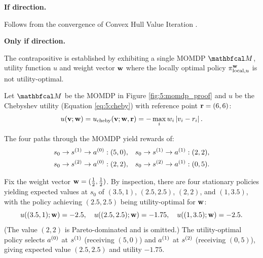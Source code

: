     \begin{proofoutline}
        \textbf{If direction.}

        Follows from the convergence of Convex Hull Value Iteration \cite{chvi}.

        \textbf{Only if direction.}

        The contrapositive is established by exhibiting a single MOMDP $\bfcl{M}$, utility function $u$ and weight vector $\mathbf{w}$ where the locally optimal policy $\pi^{\mathbf{w}}_{\text{local},u}$ is not utility-optimal. 
        
        Let $\bfcl{M}$ be the MOMDP in Figure \ref{fig:5:momdp_proof} and $u$ be the Chebyshev utility (Equation \eqref{eq:5:cheby}) with reference point $\mathbf{r} = (6, 6)$:
        \begin{align}
            u(\mathbf{v}; \mathbf{w}) = {u_{\textnormal{cheby}}}(\mathbf{v}; \mathbf{w}, \mathbf{r}) = -\max_i w_i \left| v_i - r_i \right|.
        \end{align}

        The four paths through the MOMDP yield rewards of:
        \begin{align*}
            s_0 \to s^{(1)} \to a^{(0)} &: (5, 0), &
            s_0 \to s^{(1)} \to a^{(1)} &: (2, 2), \\
            s_0 \to s^{(2)} \to a^{(0)} &: (2, 2), &
            s_0 \to s^{(2)} \to a^{(1)} &: (0, 5).
        \end{align*}

        Fix the weight vector $\mathbf{w} = (\tfrac{1}{2}, \tfrac{1}{2})$. By inspection, there are four stationary policies yielding expected values at $s_0$ of $(3.5, 1)$, 
        $(2.5, 2.5)$, $(2, 2)$, and $(1, 3.5)$, with the policy achieving 
        $(2.5, 2.5)$ being utility-optimal for $\mathbf{w}$:
        \begin{equation*}
            u((3.5, 1); \mathbf{w}) = -2.5, \quad
            u((2.5, 2.5); \mathbf{w}) = -1.75, \quad
            u((1, 3.5); \mathbf{w}) = -2.5.
        \end{equation*}
        (The value $(2, 2)$ is Pareto-dominated and is omitted.) The utility-optimal 
        policy selects $a^{(0)}$ at $s^{(1)}$ (receiving $(5, 0)$) and $a^{(1)}$ at $s^{(2)}$ 
        (receiving $(0, 5)$), giving expected value $(2.5, 2.5)$ and utility $-1.75$.
    

\end{proofoutline}
